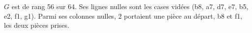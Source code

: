 $G$ est de rang 56 sur 64. Ses lignes nulles sont les cases vidées (b8, a7, d7, e7, b5, e2, f1, g1). Parmi ses colonnes nulles, 2 portaient une pièce au départ, b8 et f1, les deux pièces prises.
